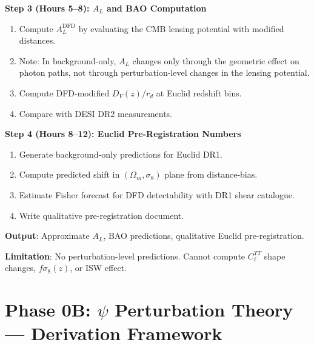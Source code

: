 \documentclass[11pt,a4paper]{article}
\begin{document}
\begin{tcolorbox}[colback=green!5!white, colframe=green!60!black,
  title={Phase 0A: 12-Hour Background-Only Computation --- Detailed Plan}]
\textbf{Step 3 (Hours 5--8): $A_L$ and BAO Computation}
\begin{enumerate}
\item Compute $A_L^{\text{DFD}}$ by evaluating the CMB lensing potential with modified distances.
\item Note: In background-only, $A_L$ changes only through the geometric effect on photon paths, not through perturbation-level changes in the lensing potential.
\item Compute DFD-modified $D_V(z)/r_d$ at Euclid redshift bins.
\item Compare with DESI DR2 measurements.
\end{enumerate}

\textbf{Step 4 (Hours 8--12): Euclid Pre-Registration Numbers}
\begin{enumerate}
\item Generate background-only predictions for Euclid DR1.
\item Compute predicted shift in $(\Omega_m, \sigma_8)$ plane from distance-bias.
\item Estimate Fisher forecast for DFD detectability with DR1 shear catalogue.
\item Write qualitative pre-registration document.
\end{enumerate}

\textbf{Output}: Approximate $A_L$, BAO predictions, qualitative Euclid pre-registration.

\textbf{Limitation}: No perturbation-level predictions. Cannot compute $C_\ell^{TT}$ shape changes, $f\sigma_8(z)$, or ISW effect.
\end{tcolorbox}

\section{Phase 0B: $\psi$ Perturbation Theory --- Derivation Framework}
\end{document}
